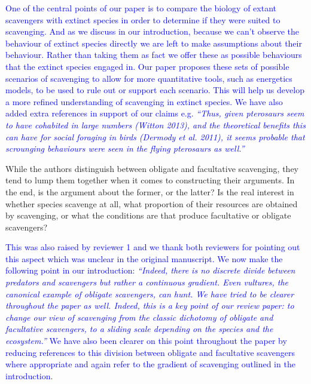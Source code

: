 \documentclass[12pt,letterpaper]{article}
\begin{document}
\bigskip
\textcolor{blue}{One of the central points of our paper is to compare the biology of extant scavengers with extinct species in order to determine if they were suited to scavenging.
And as we discuss in our introduction, because we can't observe the behaviour of extinct species directly we are left to make assumptions about their behaviour. 
Rather than taking them as fact we offer these as possible behaviours that the extinct species engaged in. Our paper proposes these sets of possible scenarios of scavenging to allow for more quantitative tools, such as energetics models, to be used to rule out or support each scenario. This will help us develop a more refined understanding of scavenging in extinct species.
We have also added extra references in support of our claims e.g. \textit {``Thus, given pterosaurs seem to have cohabited in large numbers (Witton 2013), and the theoretical benefits this can have for social foraging in birds (Dermody et al. 2011), it seems probable that scrounging behaviours were seen in the flying pterosaurs as well.''}}



\bigskip

While the authors distinguish between obligate and facultative scavenging, they tend to lump them together when it comes to constructing their arguments.
In the end, is the argument about the former, or the latter? Is the real interest in whether species scavenge at all, what proportion of their resources are obtained by scavenging, or what the conditions are that produce facultative or obligate scavengers? 

\bigskip


\textcolor{blue} {This was also raised by reviewer 1 and we thank both reviewers for pointing out this aspect which was unclear in the original manuscript.
We now make the following point in our introduction: \textit{``Indeed, there is no discrete divide between predators and scavengers but rather a continuous gradient. Even vultures, the canonical example of obligate scavengers, can hunt. We have tried to be clearer throughout the paper as well. Indeed, this is a key point of our review paper: to change our view of scavenging from the classic dichotomy of obligate and facultative scavengers, to a sliding scale depending on the species and the ecosystem.''}
We have also been clearer on this point throughout the paper by reducing references to this division between obligate and facultative scavengers where appropriate and again refer to the gradient of scavenging outlined in the introduction}.
\bigskip
\end{document}
